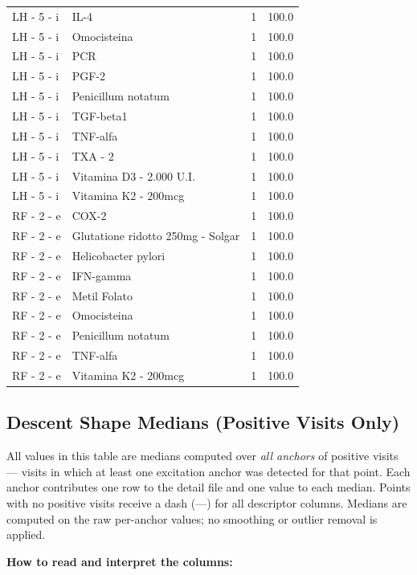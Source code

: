 \documentclass[a4paper,11pt]{article}
\begin{document}
\begin{footnotesize}
\begin{longtable}{p{3.5cm}p{7.5cm}rr}
LH - 5 - i & IL-4 & 1 & 100.0 \\
LH - 5 - i & Omocisteina & 1 & 100.0 \\
LH - 5 - i & PCR & 1 & 100.0 \\
LH - 5 - i & PGF-2 & 1 & 100.0 \\
LH - 5 - i & Penicillum notatum & 1 & 100.0 \\
LH - 5 - i & TGF-beta1 & 1 & 100.0 \\
LH - 5 - i & TNF-alfa & 1 & 100.0 \\
LH - 5 - i & TXA - 2 & 1 & 100.0 \\
LH - 5 - i & Vitamina D3 - 2.000 U.I. & 1 & 100.0 \\
LH - 5 - i & Vitamina K2 - 200mcg & 1 & 100.0 \\
RF - 2 - e & COX-2 & 1 & 100.0 \\
RF - 2 - e & Glutatione ridotto 250mg - Solgar & 1 & 100.0 \\
RF - 2 - e & Helicobacter pylori & 1 & 100.0 \\
RF - 2 - e & IFN-gamma & 1 & 100.0 \\
RF - 2 - e & Metil Folato & 1 & 100.0 \\
RF - 2 - e & Omocisteina & 1 & 100.0 \\
RF - 2 - e & Penicillum notatum & 1 & 100.0 \\
RF - 2 - e & TNF-alfa & 1 & 100.0 \\
RF - 2 - e & Vitamina K2 - 200mcg & 1 & 100.0 \\
\end{longtable}
\end{footnotesize}

\subsection{Descent Shape Medians (Positive Visits Only)}

All values in this table are medians computed over \emph{all anchors} of positive visits ---
visits in which at least one excitation anchor was detected for that point. Each anchor
contributes one row to the detail file and one value to each median. Points with no positive
visits receive a dash (---) for all descriptor columns.
Medians are computed on the raw per-anchor values; no smoothing or outlier removal is
applied.

\medskip
\noindent\textbf{How to read and interpret the columns:}
\end{document}
